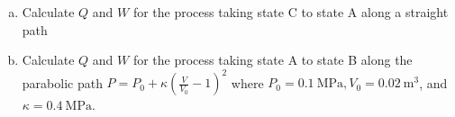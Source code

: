 \begin{enumerate}
\begin{enumerate}[(a)]
{\begin{align*}
{              (\SI{0.03}{\meter\cubed})}{(\SI{0.02}{\meter\cubed})} +
            (\SI{0.2e6}{\pascal})\right)[(\SI{0.01}{\meter\cubed})
            - (\SI{0.03}{\meter\cubed})]  \\
            \Aboxed{W &= \SI{1000}{\joule}} \\
            Q &= \Delta U - W \\
            \Delta U &= 5(P_2V_2 - P_1V_1) \\
            \Delta U &=
            5[(\SI{0.5e6}{\pascal})(\SI{0.01}{\meter\cubed}) -
              (\SI{0.2e6}{\pascal})(\SI{0.03}{\meter\cubed})
            ] \\
            \Delta U &= \SI{-5000}{\joule} \\
            Q &= \SI{-5000}{\joule} -  \SI{1000}{\joule} \\
            \Aboxed{Q &= \SI{-6000}{\joule}}
          \end{align*}
        }

        \pagebreak

      \item Calculate $Q$ and $W$ for the process taking state C to
        state A along a straight path


        \pagebreak

      \item Calculate $Q$ and $W$ for the process taking state A to
        state B along the parabolic path $P = P_0 +
        \kappa\left(\frac{V}{V_0} - 1\right)^2$ where
        $P_0 = \SI{0.1}{\mega\pascal}, V_0 = \SI{0.02}{\meter\cubed}$, and
        $\kappa = \SI{0.4}{\mega\pascal}$.


\end{enumerate}
\end{enumerate}
